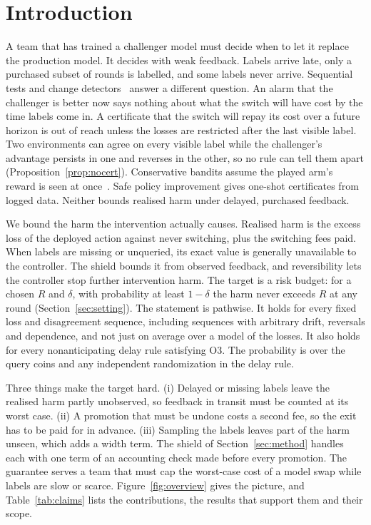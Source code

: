 \documentclass[10pt]{article}
\theoremstyle{plain}
\theoremstyle{definition}
\begin{document}
\section{Introduction}
A team that has trained a challenger model must decide when to let it replace the production model. It decides with weak feedback. Labels arrive late, only a purchased subset of rounds is labelled, and some labels never arrive.
Sequential tests and change detectors~\citep{johari2022always,podkopaev2022tracking} answer a different question. An alarm that the challenger is better now says nothing about what the switch will have cost by the time labels come in. A certificate that the switch will repay its cost over a future horizon is out of reach unless the losses are restricted after the last visible label. Two environments can agree on every visible label while the challenger's advantage persists in one and reverses in the other, so no rule can tell them apart (Proposition~\ref{prop:nocert}). Conservative bandits assume the played arm's reward is seen at once~\citep{wu2016conservative}. Safe policy improvement gives one-shot certificates from logged data. Neither bounds realised harm under delayed, purchased feedback.

We bound the harm the intervention actually causes. Realised harm is the excess loss of the deployed action against never switching, plus the switching fees paid. When labels are missing or unqueried, its exact value is generally unavailable to the controller. The shield bounds it from observed feedback, and reversibility lets the controller stop further intervention harm.
The target is a risk budget: for a chosen $R$ and $\delta$, with probability at least $1-\delta$ the harm never exceeds $R$ at any round (Section~\ref{sec:setting}).
The statement is pathwise. It holds for every fixed loss and disagreement sequence, including sequences with arbitrary drift, reversals and dependence, and not just on average over a model of the losses. It also holds for every nonanticipating delay rule satisfying O3. The probability is over the query coins and any independent randomization in the delay rule.

Three things make the target hard. (i) Delayed or missing labels leave the realised harm partly unobserved, so feedback in transit must be counted at its worst case. (ii) A promotion that must be undone costs a second fee, so the exit has to be paid for in advance. (iii) Sampling the labels leaves part of the harm unseen, which adds a width term. The shield of Section~\ref{sec:method} handles each with one term of an accounting check made before every promotion. The guarantee serves a team that must cap the worst-case cost of a model swap while labels are slow or scarce. Figure~\ref{fig:overview} gives the picture, and Table~\ref{tab:claims} lists the contributions, the results that support them and their scope.
\end{document}
